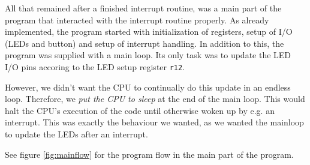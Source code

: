 All that remained after a finished interrupt routine, was a main part of
the program that interacted with the interrupt routine properly. As
already implemented, the program started with initialization of
registers, setup of I/O (LEDs and button) and setup of interrupt
handling. In addition to this, the program was supplied with a main
loop. Its only task was to update the LED I/O pins accoring to the LED
setup register \texttt{r12}.

However, we didn't want the CPU to continually do this update in an
endless loop. Therefore, we \emph{put the CPU to sleep} at the end of
the main loop. This would halt the CPU's execution of the code until
otherwise woken up by e.g. an interrupt. This was exactly the behaviour
we wanted, as we wanted the mainloop to update the LEDs after an
interrupt.

See figure \ref{fig:mainflow} for the program flow in the main part of
the program.
